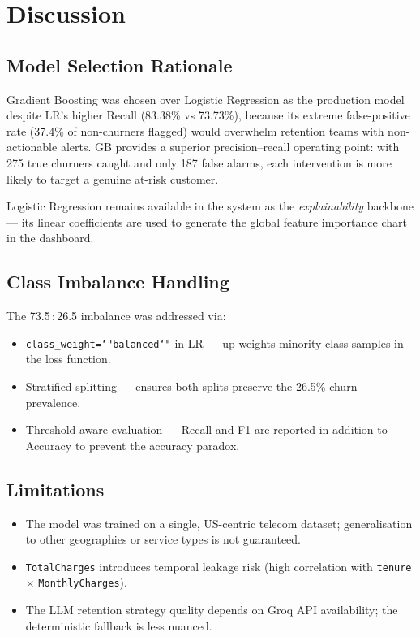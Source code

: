 \documentclass[conference]{IEEEtran}
\begin{document}
\section{Discussion}

\subsection{Model Selection Rationale}

Gradient Boosting was chosen over Logistic Regression as the production
model despite LR's higher Recall (83.38\% vs 73.73\%), because its
extreme false-positive rate (37.4\% of non-churners flagged) would
overwhelm retention teams with non-actionable alerts. GB provides a
superior precision–recall operating point: with 275 true churners caught
and only 187 false alarms, each intervention is more likely to target
a genuine at-risk customer.

Logistic Regression remains available in the system as the
\textit{explainability} backbone — its linear coefficients are used to
generate the global feature importance chart in the dashboard.

\subsection{Class Imbalance Handling}

The 73.5\,:\,26.5 imbalance was addressed via:
\begin{itemize}
  \item \texttt{class\_weight=\char`"balanced\char`"} in LR — up-weights
        minority class samples in the loss function.
  \item Stratified splitting — ensures both splits preserve the 26.5\%
        churn prevalence.
  \item Threshold-aware evaluation — Recall and F1 are reported in
        addition to Accuracy to prevent the accuracy paradox.
\end{itemize}

\subsection{Limitations}

\begin{itemize}
  \item The model was trained on a single, US-centric telecom dataset;
        generalisation to other geographies or service types is not
        guaranteed.
  \item \texttt{TotalCharges} introduces temporal leakage risk (high
        correlation with \texttt{tenure} × \texttt{MonthlyCharges}).
  \item The LLM retention strategy quality depends on Groq API
        availability; the deterministic fallback is less nuanced.
\end{itemize}
\end{document}
